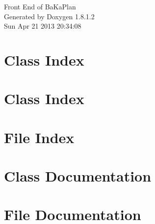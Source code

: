 \documentclass{book}
\begin{document}
\hypersetup{pageanchor=false,citecolor=blue}
\begin{titlepage}
\vspace*{7cm}
\begin{center}
{\Large Front End of Ba\-Ka\-Plan }\\
\vspace*{1cm}
{\large Generated by Doxygen 1.8.1.2}\\
\vspace*{0.5cm}
{\small Sun Apr 21 2013 20:34:08}\\
\end{center}
\end{titlepage}
\clearemptydoublepage
{}
\tableofcontents
\clearemptydoublepage
{}
\hypersetup{pageanchor=true,citecolor=blue}
\chapter{Class Index}

\chapter{Class Index}

\chapter{File Index}

\chapter{Class Documentation}




























\chapter{File Documentation}




































\printindex
\end{document}
